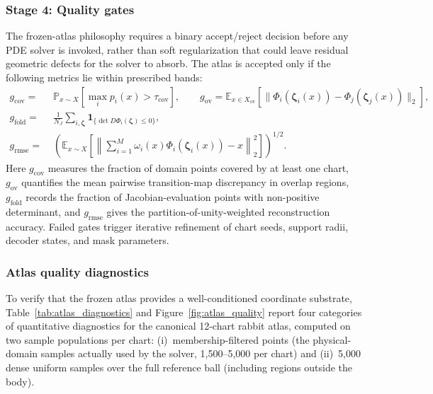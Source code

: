 \documentclass[sort&compress]{svjour3} %
\begin{document}
\subsubsection{Stage 4: Quality gates}
\label{sec:impl_gates}

The frozen-atlas philosophy requires a binary accept/reject decision before any PDE solver is invoked, rather than soft regularization that could leave residual geometric defects for the solver to absorb. The atlas is accepted only if the following metrics lie within prescribed bands:
\begin{align}
g_{\mathrm{cov}}
=&\;
\mathbb{P}_{x\sim X}
\left[
\max_i p_i(x)>\tau_{\mathrm{cov}}
\right],
\qquad
g_{\mathrm{ov}}
=
\mathbb{E}_{x\in X_{\mathrm{ov}}}
\left[
\|\Phi_i(\boldsymbol{\zeta}_i(x))-\Phi_j(\boldsymbol{\zeta}_j(x))\|_2
\right],
\nonumber\\
g_{\mathrm{fold}}
=&\;
\frac{1}{N_J}
\sum_{i,\boldsymbol{\zeta}}
\mathbf{1}_{\{\det D\Phi_i(\boldsymbol{\zeta})\le 0\}},
\label{eq:impl_gate_metrics}\\
g_{\mathrm{rmse}}
=&\;
\left(
\mathbb{E}_{x\sim X}
\left[
\left\|
\sum_{i=1}^{M}\omega_i(x)\Phi_i(\boldsymbol{\zeta}_i(x))-x
\right\|_2^2
\right]
\right)^{1/2}.
\label{eq:impl_gate_rmse}
\end{align}
Here $g_{\mathrm{cov}}$ measures the fraction of domain points covered by at least one chart, $g_{\mathrm{ov}}$ quantifies the mean pairwise transition-map discrepancy in overlap regions, $g_{\mathrm{fold}}$ records the fraction of Jacobian-evaluation points with non-positive determinant, and $g_{\mathrm{rmse}}$ gives the partition-of-unity-weighted reconstruction accuracy. Failed gates trigger iterative refinement of chart seeds, support radii, decoder states, and mask parameters.

\subsubsection{Atlas quality diagnostics}
\label{sec:atlas_diagnostics}

To verify that the frozen atlas provides a well-conditioned coordinate substrate, Table~\ref{tab:atlas_diagnostics} and Figure~\ref{fig:atlas_quality} report four categories of quantitative diagnostics for the canonical 12-chart rabbit atlas, computed on two sample populations per chart: (i)~membership-filtered points (the physical-domain samples actually used by the solver, 1{,}500--5{,}000 per chart) and (ii)~5{,}000 dense uniform samples over the full reference ball (including regions outside the body).
\end{document}
